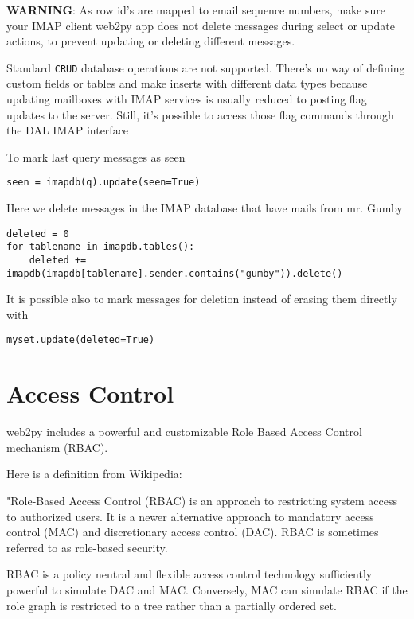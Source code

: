 \documentclass[justified,sixbynine,notoc]{tufte-book}
\def\ft{\small\tt}
\def\inxx#1{\index{#1}}
\begin{document}
\begin{fullwidth}
{\bf WARNING}: As row id's are mapped to email sequence numbers, make sure your IMAP client web2py app does not delete messages
during select or update actions, to prevent updating or deleting different messages.

Standard {\ft CRUD} database operations are not supported. There's no way of defining custom fields or tables and make inserts with different data types because updating mailboxes with IMAP services is usually reduced to posting flag updates to the server. Still, it's possible to access those flag commands through the DAL IMAP interface

To mark last query messages as seen
\begin{lstlisting}
seen = imapdb(q).update(seen=True)
\end{lstlisting}

Here we delete messages in the IMAP database that have mails from mr. Gumby
\begin{lstlisting}
deleted = 0
for tablename in imapdb.tables():
    deleted += imapdb(imapdb[tablename].sender.contains("gumby")).delete()
\end{lstlisting}

It is possible also to mark messages for deletion instead of erasing them
directly with
\begin{lstlisting}
myset.update(deleted=True)
\end{lstlisting}

\inxx{IMAP}

\goodbreak\chapter{Access Control}

\inxx{Auth} \inxx{Access Control} \inxx{RBAC} \inxx{DAC} \inxx{MAC}
\noindent web2py includes a powerful and customizable Role Based Access Control mechanism (RBAC).

Here is a definition from Wikipedia:

"Role-Based Access Control (RBAC) is an approach to restricting system access to authorized users. It is a newer alternative approach to mandatory access control (MAC) and discretionary access control (DAC). RBAC is sometimes referred to as role-based security.

RBAC is a policy neutral and flexible access control technology sufficiently powerful to simulate DAC and MAC. Conversely, MAC can simulate RBAC if the role graph is restricted to a tree rather than a partially ordered set.


\end{fullwidth}
\end{document}
